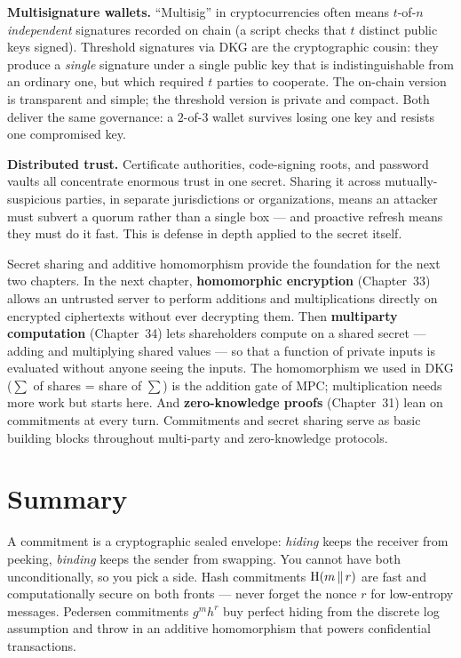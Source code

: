 \textbf{Multisignature wallets.} ``Multisig'' in cryptocurrencies often means $t$-of-$n$ \emph{independent} signatures recorded on chain (a script checks that $t$ distinct public keys signed). Threshold signatures via DKG are the cryptographic cousin: they produce a \emph{single} signature under a single public key that is indistinguishable from an ordinary one, but which required $t$ parties to cooperate. The on-chain version is transparent and simple; the threshold version is private and compact. Both deliver the same governance: a $2$-of-$3$ wallet survives losing one key and resists one compromised key.

\textbf{Distributed trust.} Certificate authorities, code-signing roots, and password vaults all concentrate enormous trust in one secret. Sharing it across mutually-suspicious parties, in separate jurisdictions or organizations, means an attacker must subvert a quorum rather than a single box --- and proactive refresh means they must do it fast. This is defense in depth applied to the secret itself.

\begin{connectionbox}
Secret sharing and additive homomorphism provide the foundation for the next two chapters. In the next chapter, \textbf{homomorphic encryption} (Chapter~33) allows an untrusted server to perform additions and multiplications directly on encrypted ciphertexts without ever decrypting them. Then \textbf{multiparty computation} (Chapter~34) lets shareholders compute on a shared secret --- adding and multiplying shared values --- so that a function of private inputs is evaluated without anyone seeing the inputs. The homomorphism we used in DKG ($\sum$ of shares = share of $\sum$) is the addition gate of MPC; multiplication needs more work but starts here. And \textbf{zero-knowledge proofs} (Chapter~31) lean on commitments at every turn. Commitments and secret sharing serve as basic building blocks throughout multi-party and zero-knowledge protocols.
\end{connectionbox}

\section{Summary}
\label{ch32:summary}

A commitment is a cryptographic sealed envelope: \emph{hiding} keeps the receiver from peeking, \emph{binding} keeps the sender from swapping. You cannot have both unconditionally, so you pick a side. Hash commitments $\operatorname{H}(m\,\|\, r)$ are fast and computationally secure on both fronts --- never forget the nonce $r$ for low-entropy messages. Pedersen commitments $g^m h^r$ buy perfect hiding from the discrete log assumption and throw in an additive homomorphism that powers confidential transactions.

